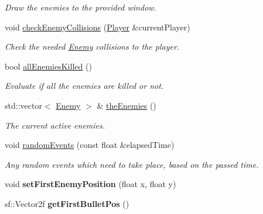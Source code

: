 \begin{DoxyCompactItemize}
\begin{DoxyCompactList}\small\item\em Draw the enemies to the provided window. \end{DoxyCompactList}\item 
void \hyperlink{class_enemy_manager_a317b11ce52e67c7b760b2b81755fd95f}{check\+Enemy\+Collisions} (\hyperlink{class_player}{Player} \&current\+Player)
\begin{DoxyCompactList}\small\item\em Check the needed \hyperlink{class_enemy}{Enemy} collisions to the player. \end{DoxyCompactList}\item 
\mbox{\label{class_enemy_manager_a9395ad36205c9653b4511859fb82179a}} 
bool \hyperlink{class_enemy_manager_a9395ad36205c9653b4511859fb82179a}{all\+Enemies\+Killed} ()
\begin{DoxyCompactList}\small\item\em Evaluate if all the enemies are killed or not. \end{DoxyCompactList}\item 
\mbox{\label{class_enemy_manager_afee94a1383c9ec47a8a8ebb4fa4a2f7b}} 
std\+::vector$<$ \hyperlink{class_enemy}{Enemy} $>$ \& \hyperlink{class_enemy_manager_afee94a1383c9ec47a8a8ebb4fa4a2f7b}{the\+Enemies} ()
\begin{DoxyCompactList}\small\item\em The current active enemies. \end{DoxyCompactList}\item 
void \hyperlink{class_enemy_manager_abafa080764d42fbc020c33e48c7afb2f}{random\+Events} (const float \&elapsed\+Time)
\begin{DoxyCompactList}\small\item\em Any random events which need to take place, based on the passed time. \end{DoxyCompactList}\item 
\mbox{\label{class_enemy_manager_a5aacf80c75d457dfc2274c5f3be3ca96}} 
void {\bfseries set\+First\+Enemy\+Position} (float x, float y)
\item 
\mbox{\label{class_enemy_manager_a0632e71c86c73e74708d34df6d1fefba}} 
sf\+::\+Vector2f {\bfseries get\+First\+Bullet\+Pos} ()

\end{DoxyCompactItemize}
